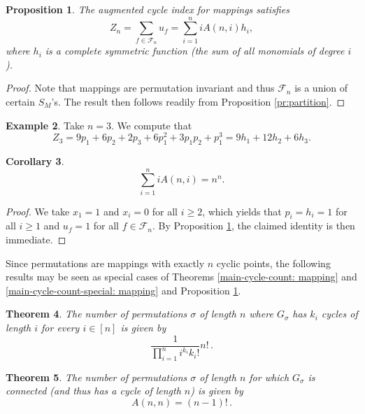 \documentclass[letterpaper]{amsart}
\theoremstyle{plain}
\newtheorem{theorem}{Theorem}
\newtheorem{proposition}[theorem]{Proposition}
\newtheorem{corollary}[theorem]{Corollary}
\theoremstyle{definition}
\newtheorem{example}[theorem]{Example}
\theoremstyle{remark}
\begin{document}
\begin{proposition}\label{pr:mapping-augmented}
The augmented cycle index for mappings satisfies
\[Z_n=\sum_{f \in \mathcal{F}_n} u_f=\sum_{i=1}^n i A(n,i) h_i,\]
where $h_i$ is a complete symmetric function (the sum of all monomials of degree $i$).
\end{proposition}

\begin{proof}
Note that mappings are permutation invariant and thus $\mathcal{F}_n$ is a union of certain $S_M$'s. The result then follows readily from Proposition \ref{pr:partition}.
\end{proof}

\begin{example}
Take $n=3$. We compute that
\[Z_3=9p_1+6p_2+2p_3+6p_1^2+3p_1p_2+p_1^3=9h_1+12h_2+6h_3.\]
\end{example}

\begin{corollary}
\begin{equation*}
\sum_{i=1}^n i A(n,i) = n^n.
\end{equation*}
\end{corollary}

\begin{proof}
We take $x_1=1$ and $x_i=0$ for all $i\geq 2$, which yields that $p_i=h_i=1$ for all $i \geq 1$ and $u_f=1$ for all $f \in \mathcal{F}_n$. By Proposition \ref{pr:mapping-augmented}, the claimed identity is then immediate.
\end{proof}

Since permutations are mappings with exactly $n$ cyclic points, the following results may be seen as special cases of Theorems \ref{main-cycle-count: mapping} and \ref{main-cycle-count-special: mapping} and Proposition \ref{pr:mapping-augmented}.

\begin{theorem}\label{main-cycle-count: permutation}
The number of permutations $\sigma$ of length $n$ where $G_\sigma$ has $k_i$ cycles of length $i$ for every $i \in [n]$ is given by
\begin{equation*}
\frac{1}{\prod_{i=1}^n i^{k_i} k_i!}n!\,.
\end{equation*}
\end{theorem}

\begin{theorem}\label{main-cycle-count-special: permutation}
The number of permutations $\sigma$ of length $n$ for which $G_\sigma$ is connected (and thus has a cycle of length $n$) is given by
\begin{equation*}
A(n, n)=(n-1)!\,.
\end{equation*}
\end{theorem}
\end{document}
